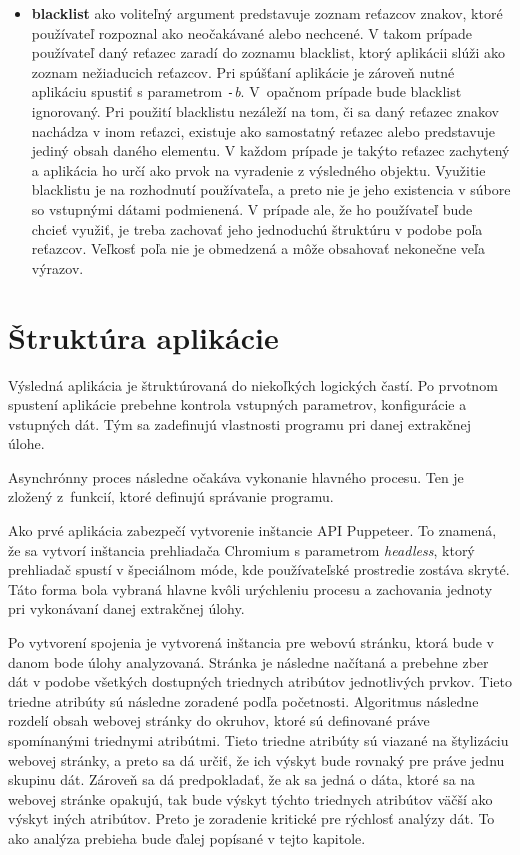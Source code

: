 \begin{itemize}
  \item \textbf{blacklist} ako voliteľný argument predstavuje zoznam reťazcov znakov, ktoré používateľ rozpoznal ako neočakávané alebo nechcené. V takom prípade používateľ daný reťazec zaradí do zoznamu blacklist, ktorý aplikácii slúži ako zoznam nežiaducich reťazcov. Pri spúšťaní aplikácie je zároveň nutné aplikáciu spustiť s parametrom \textit{\texttt{-}b}. V~opačnom prípade bude blacklist ignorovaný. Pri použití blacklistu nezáleží na tom, či sa daný reťazec znakov nachádza v inom reťazci, existuje ako samostatný reťazec alebo predstavuje jediný obsah daného elementu. V každom prípade je takýto reťazec zachytený a aplikácia ho určí ako prvok na vyradenie z výsledného objektu. Využitie blacklistu je na rozhodnutí používateľa, a preto nie je jeho existencia v súbore so vstupnými dátami podmienená. V prípade ale, že ho používateľ bude chcieť využiť, je treba zachovať jeho jednoduchú štruktúru v podobe poľa reťazcov. Veľkosť poľa nie je obmedzená a môže obsahovať nekonečne veľa výrazov. 
 \end{itemize}
 
 \section{Štruktúra aplikácie}
 
 Výsledná aplikácia je štruktúrovaná do niekoľkých logických častí. Po prvotnom spustení aplikácie prebehne kontrola vstupných parametrov, konfigurácie a vstupných dát. Tým sa zadefinujú vlastnosti programu pri danej extrakčnej úlohe.
 
 Asynchrónny proces následne očakáva vykonanie hlavného procesu. Ten je zložený z~funkcií, ktoré definujú správanie programu. 
 
 Ako prvé aplikácia zabezpečí vytvorenie inštancie API Puppeteer. To znamená, že sa vytvorí inštancia prehliadača Chromium s parametrom \textit{headless}, ktorý prehliadač spustí v špeciálnom móde, kde používateľské prostredie zostáva skryté. Táto forma bola vybraná hlavne kvôli urýchleniu procesu a zachovania jednoty pri vykonávaní danej extrakčnej úlohy. 
 
 Po vytvorení spojenia je vytvorená inštancia pre webovú stránku, ktorá bude v danom bode úlohy analyzovaná. Stránka je následne načítaná a prebehne zber dát v podobe všetkých dostupných triednych atribútov jednotlivých prvkov. Tieto triedne atribúty sú následne zoradené podľa početnosti. Algoritmus následne rozdelí obsah webovej stránky do okruhov, ktoré sú definované práve spomínanými triednymi atribútmi. Tieto triedne atribúty sú viazané na štylizáciu webovej stránky, a preto sa dá určiť, že ich výskyt bude rovnaký pre práve jednu skupinu dát. Zároveň sa dá predpokladať, že ak sa jedná o dáta, ktoré sa na webovej stránke opakujú, tak bude výskyt týchto triednych atribútov väčší ako výskyt iných atribútov. Preto je zoradenie kritické pre rýchlosť analýzy dát. To ako analýza prebieha bude ďalej popísané v tejto kapitole.
 
